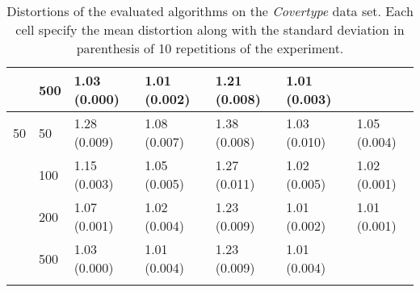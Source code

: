 \begin{longtable}{lllllll}
   & 500 &  1.03 (0.000) &   1.01 (0.002) &  1.21 (0.008) &         1.01 (0.003) &  \\
 \midrule
50 & 50  &  1.28 (0.009) &   1.08 (0.007) &  1.38 (0.008) &         1.03 (0.010) &  1.05 (0.004) \\
   & 100 &  1.15 (0.003) &   1.05 (0.005) &  1.27 (0.011) &         1.02 (0.005) &  1.02 (0.001) \\
   & 200 &  1.07 (0.001) &   1.02 (0.004) &  1.23 (0.009) &         1.01 (0.002) &  1.01 (0.001) \\
   & 500 &  1.03 (0.000) &   1.01 (0.004) &  1.23 (0.009) &         1.01 (0.004) &            \\
\bottomrule
\caption{Distortions of the evaluated algorithms on the \textit{Covertype} data set. Each cell specify the mean distortion along with the standard deviation in parenthesis of 10 repetitions of the experiment.}
\label{tab:distortions-mean-std-covertype}
\end{longtable}

